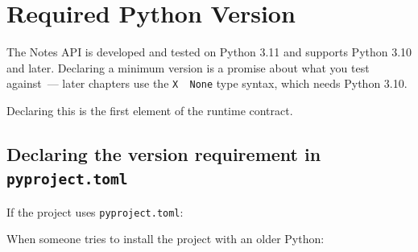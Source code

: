 \setcounter{section}{0}
\section{Required Python Version}\label{14-runtime-contract:141-required-python-version}

The Notes API is developed and tested on Python 3.11 and supports Python 3.10 and later. Declaring a minimum version is a promise about what you test against~--- later chapters use the \texttt{X\ \textbar{}\ None} type syntax, which needs Python 3.10.

Declaring this is the first element of the runtime contract.

\subsection*{\texorpdfstring{Declaring the version requirement in \texttt{pyproject.toml}}{Declaring the version requirement in pyproject.toml}}\label{14-runtime-contract:declaring-the-version-requirement-in-pyprojecttoml}

If the project uses \texttt{pyproject.toml}:

\begin{codebox}[short]

\begin{Shaded}
\begin{Highlighting}[]
\KeywordTok{[project]}
 \OperatorTok{=} 
 \OperatorTok{=} 
\end{Highlighting}
\end{Shaded}

\end{codebox}

\noindent{}When someone tries to install the project with an older Python:

\begin{codebox}[short]

\begin{Shaded}
\begin{Highlighting}[]
\end{Highlighting}
\end{Shaded}

\end{codebox}

